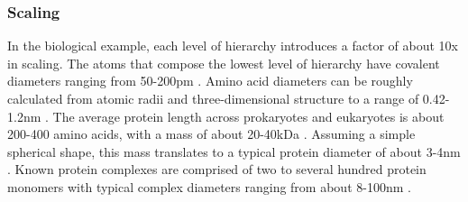 {\subsubsection{Scaling}

In the biological example, each level of hierarchy introduces a factor of about 10x in scaling.  The atoms that compose the lowest level of hierarchy have covalent diameters ranging from 50-200pm \cite{Slater1993}.  Amino acid diameters can be roughly calculated from atomic radii and three-dimensional structure to a range of 0.42-1.2nm \cite{Pool2003}.  The average protein length across prokaryotes and eukaryotes is about 200-400 amino acids, with a mass of about 20-40kDa \cite{Brocchieri2005}.  Assuming a simple spherical shape, this mass translates to a typical protein diameter of about 3-4nm \cite{Erickson2009}.  Known protein complexes are comprised of two to several hundred protein monomers with typical complex diameters ranging from about 8-100nm \cite{Yang2010a}.

%

%
%
%

}
